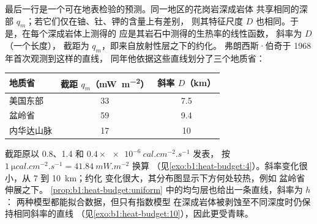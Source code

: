 最后一行是一个可在地表检验的预测。同一地区的花岗岩深成岩体
共享相同的深部 $q_m$；若它们仅在铀、钍、钾的含量上有差别，
则其特征尺度 $D$ 也相同。于是，在每个深成岩体上测得的
应是其岩石中测得的生热率的线性函数，
斜率为 $D$（一个长度），
截距为 $q_m$，即来自放射性层之下的约化。
弗朗西斯·伯奇于 1968 年首次观测到这样的直线，
同年他依据这些直线划分了三个地质省：
\begin{center}
\small
\begin{tabular}{lcc}
\hline
地质省 & 截距 $q_m$（\unit{mW.m^{-2}}） & 斜率 $D$（\unit{km}） \\
\hline
美国东部 & 33 & 7.5 \\
盆岭省 & 59 & 9.4 \\
内华达山脉 & 17 & 10 \\
\hline
\end{tabular}
\end{center}
截距原以 0.8、1.4 和 $0.4\times\qty{e-6}{cal.cm^{-2}.s^{-1}}$ 发表，
按 $\qty{1}{\micro cal.cm^{-2}.s^{-1}} = \qty{41.84}{mW.m^{-2}}$ 换算
（见\cref{exo:b1:heat-budget:4}）。斜率变化很小，从 7 到 \qty{10}{km}；约化
变化很大，其分布图显示下方何处较热，例如
盆岭省伸展之下。
\cref{prop:b1:heat-budget:uniform} 中的均匀层也给出一条直线，斜率为 $h$：
两种模型都能拟合数据，但只有指数模型
在深成岩体被剥蚀至不同深度时仍保持相同斜率的直线
（见\cref{exo:b1:heat-budget:10}），因此更受青睐。

